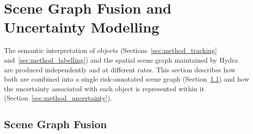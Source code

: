

























\section{Scene Graph Fusion and Uncertainty Modelling}
\label{sec:method_fusion}

{\small

The semantic interpretation of objects (Sections~\ref{sec:method_tracking} and~\ref{sec:method_labelling}) and the spatial scene graph maintained by Hydra~\cite{hughes2022hydra} are produced independently and at different rates. This section describes how both are combined into a single risk-annotated scene graph (Section~\ref{subsec:method_graph_fusion}) and how the uncertainty associated with each object is represented within it (Section~\ref{sec:method_uncertainty}).

}

\subsection{Scene Graph Fusion}
\label{subsec:method_graph_fusion}

